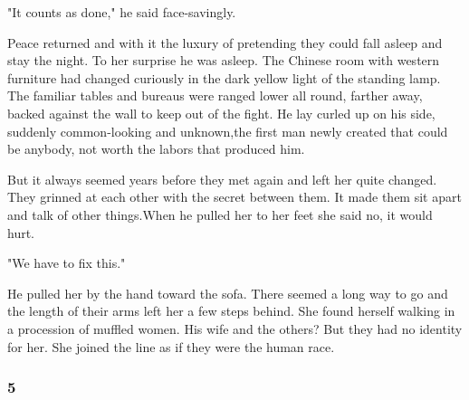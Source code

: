 \par "It counts as done," he said face-savingly.
\par Peace returned and with it the luxury of pretending they could fall asleep and stay the night. To her surprise he was asleep. The Chinese room with western furniture had changed curiously in the dark yellow light of the standing lamp. The familiar tables and bureaus were ranged lower all round, farther away, backed against the wall to keep out of the fight. He lay curled up on his side, suddenly common-looking and unknown,the first man newly created that could be anybody, not worth the labors that produced him.
\par But it always seemed years before they met again and left her quite changed. They grinned at each other with the secret between them. It made them sit apart and talk of other things.When he pulled her to her feet she said no, it would hurt.
\par "We have to fix this."
\par He pulled her by the hand toward the sofa. There seemed a long way to go and the length of their arms left her a few steps behind. She found herself walking in a procession of muffled women. His wife and the others? But they had no identity for her. She joined the line as if they were the human race.









\subsubsection*{5}


